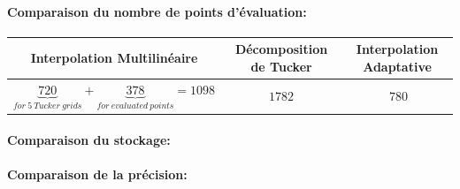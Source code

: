 \paragraph{Comparaison du nombre de points d'évaluation:}
\begin{center}
\begin{tabular}{|*{3}{c|}}
	\hline
	Interpolation Multilinéaire    																																& Décomposition de Tucker 	& Interpolation Adaptative 	\\
	\hline
	$\underbrace{720}_{for\ 5\ Tucker\ grids} + \underbrace{378}_{for\ evaluated\ points} = 1098$	& $1782$										& $~780$ 								\\
	\hline
\end{tabular}
\end{center}


\paragraph{Comparaison du stockage:}
\paragraph{Comparaison de la précision:}






